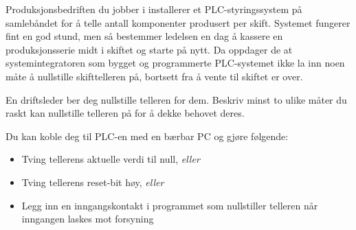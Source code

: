

Produksjonsbedriften du jobber i installerer et PLC-styringssystem på samlebåndet for å telle antall komponenter produsert per skift.  Systemet fungerer fint en god stund, men så bestemmer ledelsen en dag å kassere en produksjonsserie midt i skiftet og starte på nytt.  Da oppdager de at systemintegratoren som bygget og programmerte PLC-systemet ikke la inn noen måte å nullstille skifttelleren på, bortsett fra å vente til skiftet er over.

\vskip 10pt

En driftsleder ber deg nullstille telleren for dem.  Beskriv minst to ulike måter du raskt kan nullstille telleren på for å dekke behovet deres.














Du kan koble deg til PLC-en med en bærbar PC og gjøre følgende:

\begin{itemize}
\item{} Tving tellerens aktuelle verdi til null, \textit{eller}
\item{} Tving tellerens reset-bit høy, \textit{eller}
\item{} Legg inn en inngangskontakt i programmet som nullstiller telleren når inngangen laskes mot forsyning
\end{itemize}



